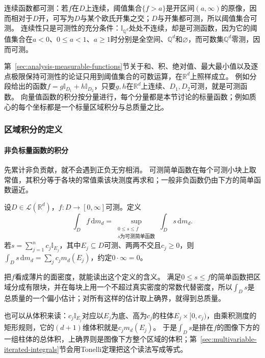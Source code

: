 连续函数都可测：若$f$在$D$上连续，阈值集合$\{f>a\}$是开区间$(a,\infty)$的原像，因而相对于$D$开，可写为$D$与某个欧氏开集之交；$D$与开集都可测，所以阈值集合可测。
连续性只是可测性的充分条件：$\mathbb I_{\mathbb Q^d}$处处不连续，却是可测函数，因为它的阈值集合在$a<0$、$0\leq a<1$、$a\geq1$时分别是全空间、$\mathbb Q^d$和$\varnothing$，而可数集$\mathbb Q^d$零测，因而可测。

第~\ref{sec:analysis-measurable-functions}节关于和、积、绝对值、最大最小值以及逐点极限保持可测性的论证只用到阈值集合的可数运算，在$\mathbb R^d$上照样成立。
例如分段给出的函数$f=g\mathbb I_{D_1}+h\mathbb I_{D_2}$，只要$g,h$在$\mathbb R^d$上连续、$D_1,D_2$可测，就是可测函数。
向量值函数的积分按分量进行，每个分量都是本节讨论的标量函数；例如质心的每个坐标都是一个标量区域积分与总质量之比。

\subsubsection{区域积分的定义}

\paragraph{非负标量函数的积分}

先累计非负贡献，就不会遇到正负无穷相消。
可测简单函数在每个可测小块上取常值，其积分等于各块的常值乘该块测度再求和；一般非负函数仍由下方的简单函数逼近。
\begin{definition}[区域上非负可测函数的积分]
设$D\in\mathcal L(\mathbb R^d)$，$f:D\to[0,\infty]$可测。定义
\[
 \int_D f\,\mathrm dm_d
 =\sup_{\substack{0\leq s\leq f\\s\text{为可测简单函数}}}
 \int_D s\,\mathrm dm_d.
\]
若$s=\sum_{j=1}^n c_j\mathbb I_{E_j}$，其中$E_j\subseteq D$可测、两两不交且$c_j\geq0$，则$\int_Ds\,\mathrm dm_d=\sum_jc_jm_d(E_j)$，约定$0\cdot\infty=0$。
\end{definition}

把$f$看成薄片的面密度，就能读出这个定义的含义。
满足$0\leq s\leq f$的简单函数把区域分成有限块，并在每块上用一个不超过真实密度的常数代替密度，所以$\int_Ds$是总质量的一个偏小估计；对所有这样的估计取上确界，就得到总质量。

也可以从体积来读：$c_j\mathbb I_{E_j}$对应以$E_j$为底、高为$c_j$的柱体$E_j\times[0,c_j)$，由乘积测度的矩形规则，它的$(d+1)$维体积就是$c_jm_d(E_j)$。
于是$\int_Ds$是排在$f$的图像下方的一组柱体的总体积，上确界则是图像下方整个区域的体积；第~\ref{sec:multivariable-iterated-integrals}节会用Tonelli定理把这个读法写成等式。

